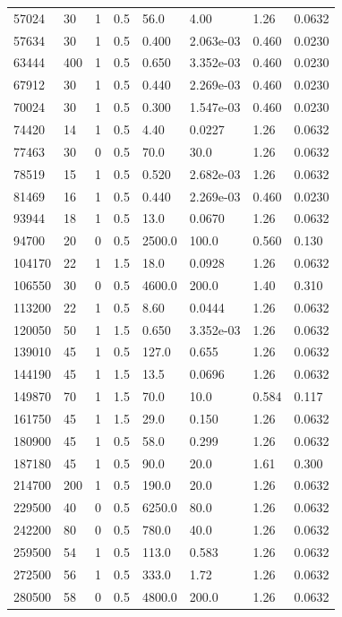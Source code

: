 \documentclass[preview]{standalone}
\begin{document}
{{\begin{tabular}{L{1.2cm}C{1.2cm} C{0.3cm}C{0.5cm} C{1.4cm}C{1.4cm} C{1.4cm}C{1.4cm}}
  57024  &    30  & 1     & 0.5 &  56.0  & 4.00  & 1.26 &  0.0632   \\ 
  57634  &    30  & 1     & 0.5 &  0.400  & 2.063e-03  & 0.460 &  0.0230   \\ 
  63444  &   400  & 1     & 0.5 &  0.650  & 3.352e-03  & 0.460 &  0.0230   \\ 
  67912  &    30  & 1     & 0.5 &  0.440  & 2.269e-03  & 0.460 &  0.0230   \\ 
  70024  &    30  & 1     & 0.5 &  0.300  & 1.547e-03  & 0.460 &  0.0230   \\ 
  74420  &    14  & 1     & 0.5 &  4.40  & 0.0227  & 1.26 &  0.0632   \\ 
  77463  &    30  & 0     & 0.5 &  70.0  & 30.0  & 1.26 &  0.0632   \\ 
  78519  &    15  & 1     & 0.5 &  0.520  & 2.682e-03  & 1.26 &  0.0632   \\ 
  81469  &    16  & 1     & 0.5 &  0.440  & 2.269e-03  & 0.460 &  0.0230   \\ 
  93944  &    18  & 1     & 0.5 &  13.0  & 0.0670  & 1.26 &  0.0632   \\ 
  94700  &    20  & 0     & 0.5 &  2500.0  & 100.0  & 0.560 &  0.130   \\ 
  104170  &    22  & 1     & 1.5 &  18.0  & 0.0928  & 1.26 &  0.0632   \\ 
  106550  &    30  & 0     & 0.5 &  4600.0  & 200.0  & 1.40 &  0.310   \\ 
  113200  &    22  & 1     & 0.5 &  8.60  & 0.0444  & 1.26 &  0.0632   \\ 
  120050  &    50  & 1     & 1.5 &  0.650  & 3.352e-03  & 1.26 &  0.0632   \\ 
  139010  &    45  & 1     & 0.5 &  127.0  & 0.655  & 1.26 &  0.0632   \\ 
  144190  &    45  & 1     & 1.5 &  13.5  & 0.0696  & 1.26 &  0.0632   \\ 
  149870  &    70  & 1     & 1.5 &  70.0  & 10.0  & 0.584 &  0.117   \\ 
  161750  &    45  & 1     & 1.5 &  29.0  & 0.150  & 1.26 &  0.0632   \\ 
  180900  &    45  & 1     & 0.5 &  58.0  & 0.299  & 1.26 &  0.0632   \\ 
  187180  &    45  & 1     & 0.5 &  90.0  & 20.0  & 1.61 &  0.300   \\ 
  214700  &   200  & 1     & 0.5 &  190.0  & 20.0  & 1.26 &  0.0632   \\ 
  229500  &    40  & 0     & 0.5 &  6250.0  & 80.0  & 1.26 &  0.0632   \\ 
  242200  &    80  & 0     & 0.5 &  780.0  & 40.0  & 1.26 &  0.0632   \\ 
  259500  &    54  & 1     & 0.5 &  113.0  & 0.583  & 1.26 &  0.0632   \\ 
  272500  &    56  & 1     & 0.5 &  333.0  & 1.72  & 1.26 &  0.0632   \\ 
  280500  &    58  & 0     & 0.5 &  4800.0  & 200.0  & 1.26 &  0.0632   \\ 
\hline 
\end{tabular} 

}}
\end{document}
